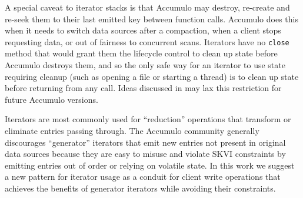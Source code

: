 A special caveat to iterator stacks is that Accumulo may destroy, re-create 
and re-seek them to their last emitted key between function calls.
Accumulo does this when it needs to switch data sources after a compaction, 
when a client stops requesting data, or out of fairness to concurrent scans.
Iterators have no \texttt{close} method that would grant them the lifecycle control to clean up state
before Accumulo destroys them, and so the only safe way for an 
iterator to use state requiring cleanup (such as opening a file or starting a thread)
is to clean up state before returning from any call.
Ideas discussed in \cite{ACCUMULO-3751} may lax this restriction for future Accumulo versions.


Iterators are most commonly used for ``reduction'' operations that transform
or eliminate entries passing through.  The Accumulo community generally discourages ``generator'' iterators 
that emit new entries not present in original data sources %
because they are easy to misuse and violate SKVI constraints by emitting entries out of order or 
relying on volatile state.
In this work we suggest a new pattern for iterator usage as a conduit for client write operations 
that achieves the benefits of generator iterators while avoiding their constraints.

